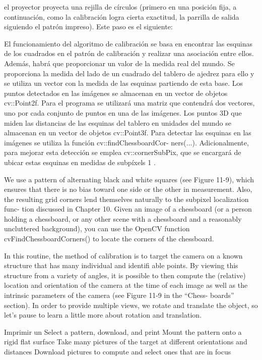 el proyector proyecta una rejilla de círculos (primero en una posición fija, a continuación, como la calibración logra cierta exactitud, la parrilla de salida siguiendo el patrón impreso). Este paso es el siguiente: 

El funcionamiento del algoritmo de calibración se basa en encontrar las esquinas de los
cuadrados en el patrón de calibración y realizar una asociación entre ellos. Además, habrá
que proporcionar un valor de la medida real del mundo. Se proporciona la medida del lado
de un cuadrado del tablero de ajedrez para ello y se utiliza un vector con la medida de las
esquinas partiendo de esta base.
Los puntos detectados en las imágenes se almacenan en un vector de objetos cv::Point2f.
Para el programa se utilizará una matriz que contendrá dos vectores, uno por cada conjunto
de puntos en una de las imágenes. Los puntos 3D que miden las distancias de las esquinas del
tablero en unidades del mundo se almacenan en un vector de objetos cv::Point3f.
Para detectar las esquinas en las imágenes se utiliza la función cv::findChessboardCor-
ners(...). Adicionalmente, para mejorar esta detección se emplea cv::cornerSubPix, que se
encargará de ubicar estas esquinas en medidas de subpíxels 1 .


We use a pattern of alternating black and white squares (see Figure 11-9),
which ensures that there is no bias toward one side or the other in measurement. Also,
the resulting grid corners lend themselves naturally to the subpixel localization func-
tion discussed in Chapter 10.
Given an image of a chessboard (or a person holding a chessboard, or any other scene
with a chessboard and a reasonably uncluttered background), you can use the OpenCV
function cvFindChessboardCorners() to locate the corners of the chessboard.


In this routine, the method of
calibration is to target the camera on a known structure that has many individual and
identifi able points. By viewing this structure from a variety of angles, it is possible to
then compute the (relative) location and orientation of the camera at the time of each
image as well as the intrinsic parameters of the camera (see Figure 11-9 in the “Chess-
boards” section). In order to provide multiple views, we rotate and translate the object,
so let’s pause to learn a little more about rotation and translation.

Imprimir un Select a pattern, download, and print
Mount the pattern onto a rigid flat surface
Take many pictures of the target at different orientations and distances
Download pictures to compute and select ones that are in focus
